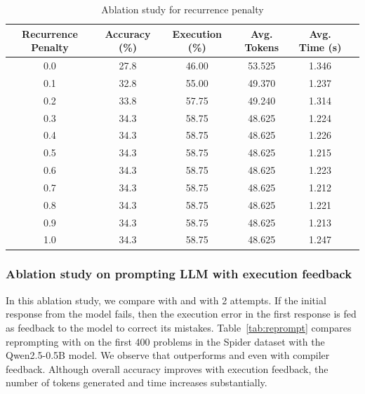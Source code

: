 \begin{table}[h]
    \centering
    \scriptsize
    \caption{Ablation study for recurrence penalty}
    \label{tab:rec_penalty}
    \begin{tabular}{@{}cccccc@{}}
        \toprule
        Recurrence Penalty & Accuracy (\%) & Execution (\%) & Avg. Tokens & Avg. Time (s) \\ \midrule
        0.0                 & 27.8           & 46.00          & 53.525      & 1.346          \\
        0.1                 & 32.8           & 55.00          & 49.370      & 1.237          \\
        0.2                 & 33.8           & 57.75          & 49.240      & 1.314          \\
        0.3                 & 34.3           & 58.75          & 48.625      & 1.224          \\
        0.4                 & 34.3           & 58.75          & 48.625      & 1.226          \\
        0.5                 & 34.3           & 58.75          & 48.625      & 1.215          \\
        0.6                 & 34.3           & 58.75          & 48.625      & 1.223          \\
        0.7                 & 34.3           & 58.75          & 48.625      & 1.212          \\
        0.8                 & 34.3           & 58.75          & 48.625      & 1.221          \\
        0.9                 & 34.3           & 58.75          & 48.625      & 1.213          \\
        1.0                 & 34.3           & 58.75          & 48.625      & 1.247          \\
        \bottomrule
    \end{tabular}
\end{table}



\subsubsection{Ablation study on prompting LLM with execution feedback}

In this ablation study, we compare \Tool{} with \standard{} and \syncode{} with 2 attempts. 
If the initial response from the model fails, then the execution error in the first response is fed as feedback to the model to correct its mistakes. 
Table~\ref{tab:reprompt} compares reprompting with \Tool{} on the first 400 problems in the Spider dataset with the Qwen2.5-0.5B model.
We observe that \Tool{} outperforms \standard{} and \syncode{} even with compiler feedback.
Although overall accuracy improves with execution feedback, the number of tokens generated and time increases substantially. 

